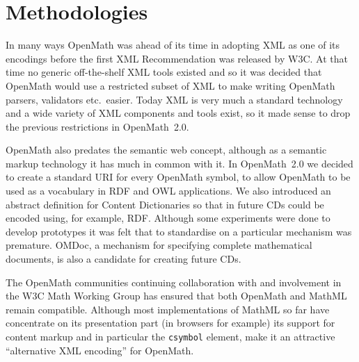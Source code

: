 \chapter{Methodologies}

In many ways OpenMath was ahead of its time in adopting XML as one of
its encodings before the first XML Recommendation was released by W3C.
At that time no generic off-the-shelf XML tools existed and so it was
decided that OpenMath would use a restricted subset of XML to make
writing OpenMath parsers, validators etc.~easier.  Today XML is very
much a standard technology and a wide variety of XML components and
tools exist, so it made sense to drop the previous restrictions in
OpenMath~2.0.  

OpenMath also predates the semantic web concept, although as a semantic
markup technology it has much in common with it.  In OpenMath~2.0 we
decided to create a standard URI for every OpenMath symbol, to allow
OpenMath to be used as a vocabulary in RDF and OWL applications.  We
also introduced an abstract definition for Content Dictionaries so that
in future CDs could be encoded using, for example, RDF.  Although some
experiments were done to develop prototypes it was felt that to
standardise on a particular mechanism was premature.  OMDoc, a mechanism
for specifying complete mathematical documents, is also a candidate for
creating future CDs.

The OpenMath communities continuing collaboration with and involvement
in the W3C Math Working Group has ensured that both OpenMath and MathML
remain compatible.  Although most implementations of MathML so far have
concentrate on its presentation part (in browsers for example) its
support for content markup and in particular the {\tt csymbol} element,
make it an attractive ``alternative XML encoding'' for OpenMath.  
